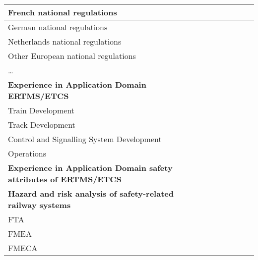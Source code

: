 \documentclass[a4paper, 11pt]{article}
\begin{document}
\begin{center}
\begin{longtable}{|r|r|r|r|r|r|r|r|}
    \multicolumn{1}{|l|}{French national regulations} & \multicolumn{1}{c|}{} &       &       &       &       &       &  \bigstrut[b]\\
    \hline
    \multicolumn{1}{|l|}{German national regulations} & \multicolumn{1}{c|}{} &       &       &       &       &       &  \bigstrut\\
    \hline
    \multicolumn{1}{|l|}{Netherlands national regulations} & \multicolumn{1}{c|}{} &       &       &       &       &       &  \bigstrut\\
    \hline
    \multicolumn{1}{|l|}{Other European national regulations} & \multicolumn{1}{c|}{} &       &       &       &       &       &  \bigstrut\\
    \hline
    \multicolumn{1}{|l|}{…} & \multicolumn{1}{c|}{} &       &       &       &       &       &  \bigstrut[t]\\
    \multicolumn{1}{|l|}{\textbf{Experience in Application Domain ERTMS/ETCS}} & \multicolumn{1}{c|}{\textbf{}} &       &       &       &       &       &  \\
    \multicolumn{1}{|l|}{Train Development} & \multicolumn{1}{c|}{} &       &       &       &       &       &  \bigstrut[b]\\
    \hline
    \multicolumn{1}{|l|}{Track Development} & \multicolumn{1}{c|}{} &       &       &       &       &       &  \bigstrut\\
    \hline
    \multicolumn{1}{|l|}{Control and Signalling System Development} & \multicolumn{1}{c|}{} &       &       &       &       &       &  \bigstrut\\
    \hline
    \multicolumn{1}{|l|}{Operations} & \multicolumn{1}{c|}{} &       &       &       &       &       &  \bigstrut[t]\\
    \multicolumn{1}{|l|}{\textbf{Experience in Application Domain safety attributes of ERTMS/ETCS}} & \multicolumn{1}{c|}{\textbf{}} &       &       &       &       &       &  \\
    \multicolumn{1}{|l|}{\textbf{Hazard and risk analysis of safety-related railway systems}} & \multicolumn{1}{c|}{\textbf{}} &       &       &       &       &       &  \\
    \multicolumn{1}{|l|}{FTA } & \multicolumn{1}{c|}{} &       &       &       &       &       &  \bigstrut[b]\\
    \hline
    \multicolumn{1}{|l|}{FMEA} & \multicolumn{1}{c|}{} &       &       &       &       &       &  \bigstrut\\
    \hline
    \multicolumn{1}{|l|}{FMECA} & \multicolumn{1}{c|}{} &       &       &       &       &       &  \bigstrut\\

\end{longtable}
\end{center}
\end{document}
